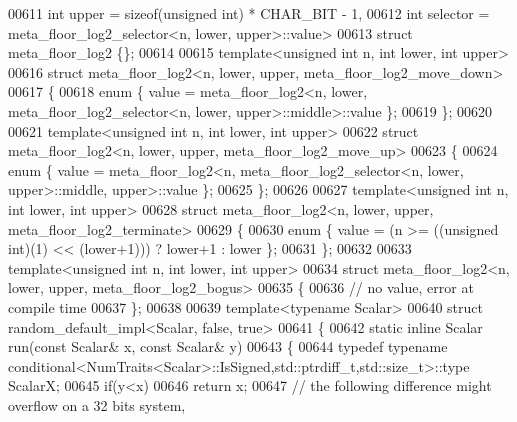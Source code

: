 \begin{DoxyCode}
00611          \textcolor{keywordtype}{int} upper = \textcolor{keyword}{sizeof}(\textcolor{keywordtype}{unsigned} int) * CHAR\_BIT - 1,
00612          \textcolor{keywordtype}{int} selector = meta\_floor\_log2\_selector<n, lower, upper>::value>
00613 \textcolor{keyword}{struct} meta\_floor\_log2 \{\};
00614 
00615 \textcolor{keyword}{template}<\textcolor{keywordtype}{unsigned} \textcolor{keywordtype}{int} n, \textcolor{keywordtype}{int} lower, \textcolor{keywordtype}{int} upper>
00616 \textcolor{keyword}{struct }meta\_floor\_log2<n, lower, upper, meta\_floor\_log2\_move\_down>
00617 \{
00618   \textcolor{keyword}{enum} \{ value = meta\_floor\_log2<n, lower, meta\_floor\_log2\_selector<n, lower, upper>::middle>::value \};
00619 \};
00620 
00621 \textcolor{keyword}{template}<\textcolor{keywordtype}{unsigned} \textcolor{keywordtype}{int} n, \textcolor{keywordtype}{int} lower, \textcolor{keywordtype}{int} upper>
00622 \textcolor{keyword}{struct }meta\_floor\_log2<n, lower, upper, meta\_floor\_log2\_move\_up>
00623 \{
00624   \textcolor{keyword}{enum} \{ value = meta\_floor\_log2<n, meta\_floor\_log2\_selector<n, lower, upper>::middle, upper>::value \};
00625 \};
00626 
00627 \textcolor{keyword}{template}<\textcolor{keywordtype}{unsigned} \textcolor{keywordtype}{int} n, \textcolor{keywordtype}{int} lower, \textcolor{keywordtype}{int} upper>
00628 \textcolor{keyword}{struct }meta\_floor\_log2<n, lower, upper, meta\_floor\_log2\_terminate>
00629 \{
00630   \textcolor{keyword}{enum} \{ value = (n >= ((\textcolor{keywordtype}{unsigned} int)(1) << (lower+1))) ? lower+1 : lower \};
00631 \};
00632 
00633 \textcolor{keyword}{template}<\textcolor{keywordtype}{unsigned} \textcolor{keywordtype}{int} n, \textcolor{keywordtype}{int} lower, \textcolor{keywordtype}{int} upper>
00634 \textcolor{keyword}{struct }meta\_floor\_log2<n, lower, upper, meta\_floor\_log2\_bogus>
00635 \{
00636   \textcolor{comment}{// no value, error at compile time}
00637 \};
00638 
00639 \textcolor{keyword}{template}<\textcolor{keyword}{typename} Scalar>
00640 \textcolor{keyword}{struct }random\_default\_impl<Scalar, false, true>
00641 \{
00642   \textcolor{keyword}{static} \textcolor{keyword}{inline} Scalar run(\textcolor{keyword}{const} Scalar& x, \textcolor{keyword}{const} Scalar& y)
00643   \{ 
00644     \textcolor{keyword}{typedef} \textcolor{keyword}{typename} conditional<NumTraits<Scalar>::IsSigned,std::ptrdiff\_t,std::size\_t>::type ScalarX;
00645     \textcolor{keywordflow}{if}(y<x)
00646       \textcolor{keywordflow}{return} x;
00647     \textcolor{comment}{// the following difference might overflow on a 32 bits system,}

\end{DoxyCode}
